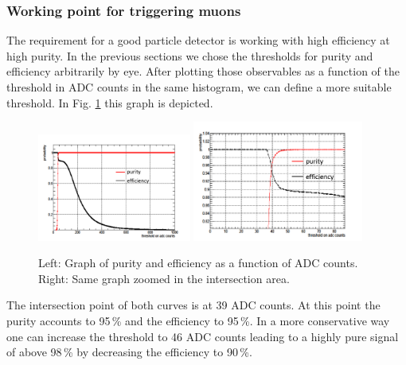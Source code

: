 		\subsubsection{Working point for triggering muons}
		\label{working_point}
			The requirement for a good particle detector is working with high efficiency at high purity.
			In the previous sections we chose the thresholds for purity and efficiency arbitrarily by eye.
			After plotting those observables as a function of the threshold in ADC counts in the same histogram, we can define a more suitable threshold.
			In Fig. \ref{fig:pur_eff} this graph is depicted.
			\begin{figure}[htbp]
				\centering
				\includegraphics[width=0.45\textwidth]{Figures/erdogan/pur_eff.png}
				\includegraphics[width=0.50\textwidth]{Figures/erdogan/pur_eff_zoom.png}
				\caption{Left: Graph of purity and efficiency as a function of ADC counts. Right: Same graph zoomed in the intersection area.}
				\label{fig:pur_eff}
			\end{figure}
			The intersection point of both curves is at 39 ADC counts.
			At this point the purity accounts to 95\,\% and the efficiency to 95\,\%.
			In a more conservative way one can increase the threshold to 46 ADC counts leading to a highly pure signal of above 98\,\% by decreasing the efficiency to 90\,\%.
